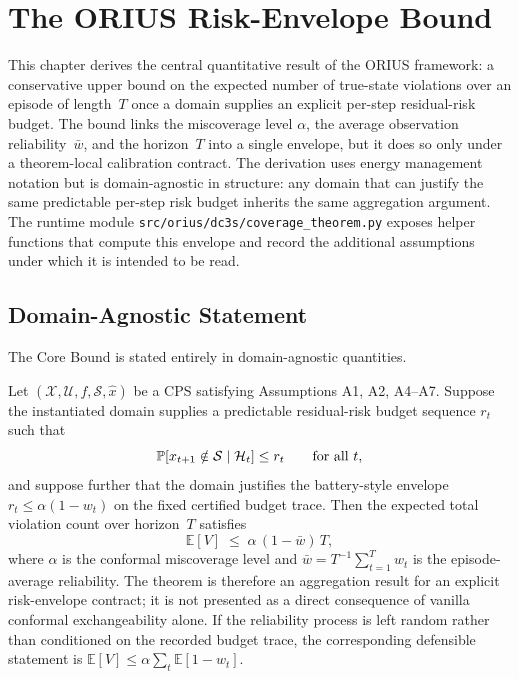 
\chapter{The ORIUS Risk-Envelope Bound}
\label{ch:core-bound}

This chapter derives the central quantitative result of the ORIUS
framework: a conservative upper bound on the expected number of true-state
violations over an episode of length~$T$ once a domain supplies an explicit
per-step residual-risk budget.  The bound links the miscoverage level
$\alpha$, the average observation reliability~$\bar{w}$, and the horizon~$T$
into a single envelope, but it does so only under a theorem-local
calibration contract.  The derivation uses energy management notation but is
domain-agnostic in structure: any domain that can justify the same predictable
per-step risk budget inherits the same aggregation argument.  The runtime
module \texttt{src/orius/dc3s/coverage\_theorem.py} exposes helper functions
that compute this envelope and record the additional assumptions under which
it is intended to be read.

\section{Domain-Agnostic Statement}

The Core Bound is stated entirely in domain-agnostic quantities.

\begin{theorem}
\label{thm:core-bound-general}
Let $(\mathcal{X}, \mathcal{U}, f, \mathcal{S}, \hat{x})$ be a CPS
satisfying Assumptions A1, A2, A4--A7.  Suppose the instantiated domain
supplies a predictable residual-risk budget sequence $r_t$ such that
\[
  \operatorname{\mathbb{P}}[x_{t+1}\notin\mathcal{S}\mid\mathcal{H}_t] \le r_t
  \qquad\text{for all } t,
\]
and suppose further that the domain justifies the battery-style envelope
$r_t \le \alpha(1-w_t)$ on the fixed certified budget trace.  Then the expected
total violation count over horizon~$T$ satisfies
\[
  \mathbb{E}[V] \;\le\; \alpha\,(1 - \bar{w})\,T,
\]
where $\alpha$ is the conformal miscoverage level and
$\bar{w} = T^{-1}\sum_{t=1}^T w_t$ is the episode-average reliability.
The theorem is therefore an aggregation result for an explicit risk-envelope
contract; it is not presented as a direct consequence of vanilla conformal
exchangeability alone.
If the reliability process is left random rather than conditioned on the
recorded budget trace, the corresponding defensible statement is
$\mathbb{E}[V]\le\alpha\sum_t\mathbb{E}[1-w_t]$.
\end{theorem}

